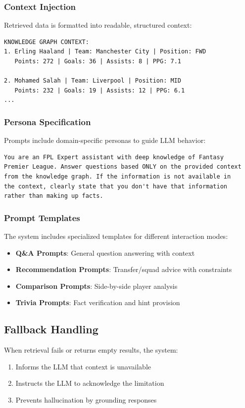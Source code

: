 \documentclass[11pt, a4paper]{article}
\begin{document}
\subsubsection{Context Injection}
Retrieved data is formatted into readable, structured context:

\begin{lstlisting}[caption={Context Formatting Example}]
KNOWLEDGE GRAPH CONTEXT:
1. Erling Haaland | Team: Manchester City | Position: FWD
   Points: 272 | Goals: 36 | Assists: 8 | PPG: 7.1

2. Mohamed Salah | Team: Liverpool | Position: MID
   Points: 232 | Goals: 19 | Assists: 12 | PPG: 6.1
...
\end{lstlisting}

\subsubsection{Persona Specification}
Prompts include domain-specific personas to guide LLM behavior:

\begin{lstlisting}[caption={FPL Expert Persona}]
You are an FPL Expert assistant with deep knowledge of Fantasy
Premier League. Answer questions based ONLY on the provided context
from the knowledge graph. If the information is not available in
the context, clearly state that you don't have that information
rather than making up facts.
\end{lstlisting}

\subsubsection{Prompt Templates}
The system includes specialized templates for different interaction modes:

\begin{itemize}
    \item \textbf{Q\&A Prompts}: General question answering with context
    \item \textbf{Recommendation Prompts}: Transfer/squad advice with constraints
    \item \textbf{Comparison Prompts}: Side-by-side player analysis
    \item \textbf{Trivia Prompts}: Fact verification and hint provision
\end{itemize}

\subsection{Fallback Handling}
When retrieval fails or returns empty results, the system:
\begin{enumerate}
    \item Informs the LLM that context is unavailable
    \item Instructs the LLM to acknowledge the limitation
    \item Prevents hallucination by grounding responses
\end{enumerate}
\end{document}
